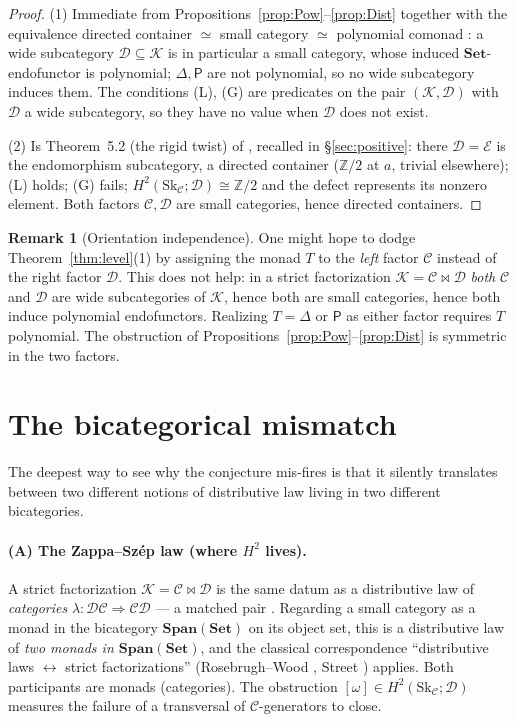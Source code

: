 \documentclass[11pt]{article}
\theoremstyle{definition}
\newtheorem{remark}[theorem]{Remark}
\newcommand{\C}{\mathcal{C}}
\newcommand{\D}{\mathcal{D}}
\newcommand{\K}{\mathcal{K}}
\newcommand{\E}{\mathcal{E}}
\newcommand{\Set}{\mathbf{Set}}
\newcommand{\Span}{\mathbf{Span}}
\newcommand{\Sk}{\mathrm{Sk}}
\newcommand{\Pow}{\mathsf{P}}
\newcommand{\Dist}{\Delta}
\begin{document}
\begin{proof}
(1) Immediate from Propositions~\ref{prop:Pow}--\ref{prop:Dist} together with the
equivalence directed container $\simeq$ small category $\simeq$ polynomial comonad
\cite{acu,auCats}: a wide subcategory $\D\subseteq\K$ is in particular a small
category, whose induced $\Set$-endofunctor is polynomial; $\Dist,\Pow$ are not
polynomial, so no wide subcategory induces them. The conditions \textnormal{(L)},
\textnormal{(G)} are predicates on the pair $(\K,\D)$ with $\D$ a wide subcategory,
so they have no value when $\D$ does not exist.

(2) Is Theorem~5.2 (the rigid twist) of \cite{Gcohom}, recalled in
\S\ref{sec:positive}: there $\D=\E$ is the endomorphism subcategory, a directed
container ($\mathbb Z/2$ at $a$, trivial elsewhere); \textnormal{(L)} holds;
\textnormal{(G)} fails; $H^2(\Sk_\C;\D)\cong\mathbb Z/2$ and the defect represents
its nonzero element. Both factors $\C,\D$ are small categories, hence directed
containers.
\end{proof}

\begin{remark}[Orientation independence]\label{rem:orient}
One might hope to dodge Theorem~\ref{thm:level}(1) by assigning the monad $T$ to the
\emph{left} factor $\C$ instead of the right factor $\D$. This does not help: in a
strict factorization $\K=\C\bowtie\D$ \emph{both} $\C$ and $\D$ are wide
subcategories of $\K$, hence both are small categories, hence both induce polynomial
endofunctors. Realizing $T=\Dist$ or $\Pow$ as either factor requires $T$ polynomial.
The obstruction of Propositions~\ref{prop:Pow}--\ref{prop:Dist} is symmetric in the
two factors.
\end{remark}

\section{The bicategorical mismatch}

The deepest way to see why the conjecture mis-fires is that it silently translates
between two different notions of distributive law living in two different
bicategories.

\paragraph{(A) The Zappa--Sz\'ep law (where $H^2$ lives).} A strict factorization
$\K=\C\bowtie\D$ is the same datum as a distributive law of \emph{categories}
$\lambda\colon\D\C\Rightarrow\C\D$ --- a matched pair \cite[\S4]{pairwise}. Regarding
a small category as a monad in the bicategory $\Span(\Set)$ on its object set, this
is a distributive law of \emph{two monads in $\Span(\Set)$}, and the classical
correspondence ``distributive laws $\leftrightarrow$ strict factorizations''
(Rosebrugh--Wood \cite{rw}, Street \cite{street}) applies. Both participants are
monads (categories). The obstruction $[\omega]\in H^2(\Sk_\C;\D)$ measures the
failure of a transversal of $\C$-generators to close.
\end{document}

